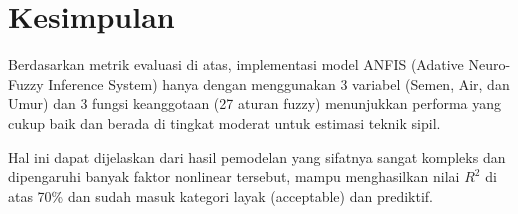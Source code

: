 \section{Kesimpulan}

Berdasarkan metrik evaluasi di atas, implementasi model ANFIS (Ada\-ti\-ve Neuro-Fuzzy Inference System) hanya dengan menggunakan 3 variabel (Semen, Air, dan Umur) dan 3 fungsi keanggotaan (27 aturan fuzzy) menunjukkan performa yang cukup baik dan berada di tingkat moderat untuk estimasi teknik sipil.

Hal ini dapat dijelaskan dari hasil pemodelan yang sifatnya sangat kompleks dan dipengaruhi banyak faktor nonlinear tersebut, mampu menghasilkan nilai $R^2$ di atas 70\% dan sudah masuk kategori layak (acceptable) dan prediktif.

